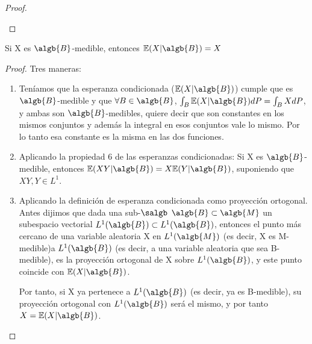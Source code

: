 \documentclass{apuntes}
\begin{document}
\begin{enumerate}
\begin{proof}
\begin{itemize}
\end{itemize}

\end{proof}
\obs Si X es $\algb{B}$-medible, entonces $\mathbb{E}(X|\algb{B})=X$
\begin{proof}
Tres maneras:
\begin{enumerate}
\item Teníamos que la esperanza condicionada ($\mathbb{E}(X|\algb{B})$) cumple que es $\algb{B}$-medible y que
$\forall B \in \algb{B}$, $\int_{B}\mathbb{E}(X|\algb{B})dP=\int_{B}XdP$, y ambas son $\algb{B}$-medibles, quiere decir que son constantes en los mismos conjuntos y además la integral en esos conjuntos vale lo mismo. Por lo tanto esa constante es la misma en las dos funciones.
\item Aplicando la propiedad 6 de las esperanzas condicionadas:
Si X es $\algb{B}$-medible, entonces $\mathbb{E}(XY|\algb{B}) = X\mathbb{E}(Y|\algb{B})$, suponiendo que $XY,Y \in L^1$.
\item Aplicando la definición de esperanza condicionada como proyección ortogonal. Antes dijimos que dada una sub-$\salgb$ $\algb{B} \subset \algb{M}$ un subespacio vectorial $L^1(\algb{B}) \subset L^1(\algb{B})$, entonces el punto más cercano de una variable aleatoria X en $L^1(\algb{M})$ (es decir, X es M-medible)a $L^1(\algb{B})$ (es decir, a una variable aleatoria que sea B-medible), es la proyección ortogonal de X sobre $L^1(\algb{B})$, y este punto coincide con $\mathbb{E}(X|\algb{B})$.

Por tanto, si X ya pertenece a $L^1(\algb{B})$ (es decir, ya es B-medible), su proyección ortogonal con $L^1(\algb{B})$ será el mismo, y por tanto $X=\mathbb{E}(X|\algb{B})$.
\end{enumerate}
\end{proof}


\end{enumerate}
\end{document}
